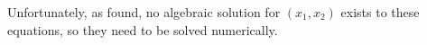 Unfortunately, as \citet{Pegden} found, no algebraic solution for $(x_{1}, x_{2})$ exists to these equations, so they need to be solved numerically.
















































